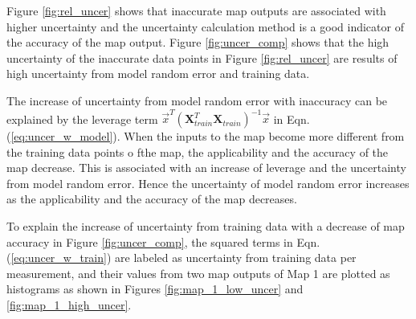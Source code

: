 Figure \ref{fig:rel_uncer} shows that inaccurate map outputs are associated with higher uncertainty and the uncertainty calculation method is a good indicator of the accuracy of the map output. Figure \ref{fig:uncer_comp} shows that the high uncertainty of the inaccurate data points in Figure \ref{fig:rel_uncer} are results of high uncertainty from model random error and training data.

The increase of uncertainty from model random error with inaccuracy can be explained by the leverage term ${\vec x^T}{({\mathbf{X}}_{train}^T{{\mathbf{X}}_{train}})^{ - 1}}\vec x$ in Eqn. (\ref{eq:uncer_w_model}). When the inputs to the map become more different from the training data points o fthe map, the applicability and the accuracy of the map decrease. This is associated with an increase of leverage and the uncertainty from model random error. Hence the uncertainty of model random error increases as the applicability and the accuracy of the map decreases.

To explain the increase of uncertainty from training data with a decrease of map accuracy in Figure \ref{fig:uncer_comp}, the squared terms in Eqn. (\ref{eq:uncer_w_train}) are labeled as uncertainty from training data per measurement, and their values from two map outputs of Map 1 are plotted as histograms as shown in Figures \ref{fig:map_1_low_uncer} and \ref{fig:map_1_high_uncer}.

